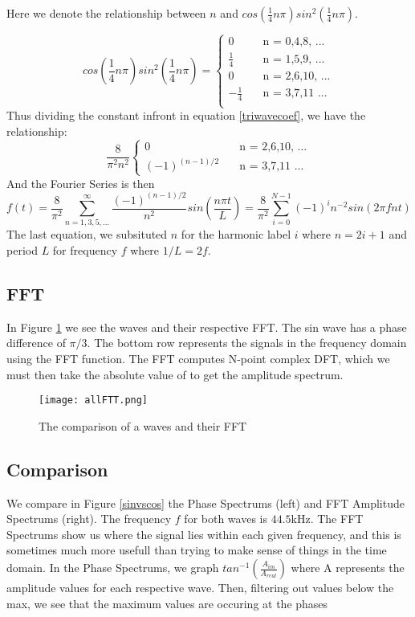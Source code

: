 \documentclass{article}
\begin{document}
Here we denote the relationship between $n$ and $cos( \frac{1}{4} n \pi ) sin^2(\frac{1}{4}n\pi)$.

\[
cos( \frac{1}{4} n \pi ) sin^2(\frac{1}{4}n\pi) =
  \begin{cases}
    \text{0} &\quad\text{n = 0,4,8, ...} \\
    \text{$\frac{1}{4}$} &\quad\text{n = 1,5,9, ...} \\
    \text{0} &\quad\text{n = 2,6,10, ...} \\
    \text{$-\frac{1}{4}$} &\quad\text{n = 3,7,11 ...} \\
  \end{cases}
\]
Thus dividing the constant infront in equation \ref{triwavecoef}, we have the relationship:
\[
\frac{8}{\pi^2 n^2}
  \begin{cases}
    \text{0} &\quad\text{n = 2,6,10, ...} \\
    \text{$(-1)^{(n-1)/2}$} &\quad\text{n = 3,7,11 ...}
  \end{cases}
\]
And the Fourier Series is then
\begin{equation}
f(t) = \frac{8}{\pi^2} \sum_{n=1,3,5,...}^{\infty} \frac{(-1)^{(n-1)/2}}{n^2}sin(\frac{n\pi t}{L}) = \frac{8}{\pi^2} \sum_{i=0}^{N-1}(-1)^in^{-2}sin(2\pi f nt)
\label{trianglewaveeq}
\end{equation}
The last equation, we subsituted $n$ for the harmonic label $i$ where $n = 2i+1$ and period $L$ for frequency $f$ where $1/L = 2f$.



\subsection{FFT}
In Figure \ref{allWaveFFT} we see the waves and their respective FFT. The sin wave has a phase difference of $\pi /3$. The bottom row represents the signals in the frequency domain using the FFT function. The FFT computes N-point complex DFT, which we must then take the absolute value of to get the amplitude spectrum.
\begin{figure}[h]
  \centering
  \texttt{[image: allFTT.png]}
  \caption{The comparison of a waves and their FFT}
  \label{allWaveFFT}
\end{figure}

\subsection{Comparison}
We compare in Figure \ref{sinvscos} the Phase Spectrums (left) and FFT Amplitude Spectrums (right). The frequency $f$ for both waves is $44.5$kHz. The FFT Spectrums show us where the signal lies within each given frequency, and this is sometimes much more usefull than trying to make sense of things in the time domain. In the Phase Spectrums, we graph $tan^{-1}(\frac{A_{im}}{A_{real}})$ where A represents the amplitude values for each respective wave. Then, filtering out values below the max, we see that the maximum values are occuring at the phases
\end{document}
